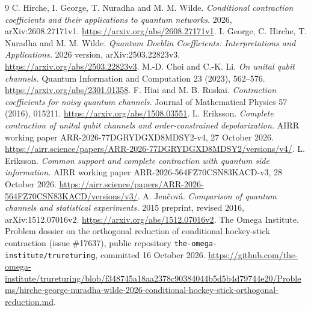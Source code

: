 \documentclass[11pt,a4paper]{article}
\begin{document}
\begin{thebibliography}{9}
 C. Hirche, I. George, T. Nuradha and M. M. Wilde.
\emph{Conditional contraction coefficients and their applications to quantum networks.}
2026, arXiv:2608.27171v1. \url{https://arxiv.org/abs/2608.27171v1}.
 I. George, C. Hirche, T. Nuradha and M. M. Wilde.
\emph{Quantum Doeblin Coefficients: Interpretations and Applications.}
2026 version, arXiv:2503.22823v3. \url{https://arxiv.org/abs/2503.22823v3}.
 M.-D. Choi and C.-K. Li.
\emph{On unital qubit channels.} Quantum Information and Computation 23 (2023), 562--576.
\url{https://arxiv.org/abs/2301.01358}.
 F. Hiai and M. B. Ruskai.
\emph{Contraction coefficients for noisy quantum channels.} Journal of Mathematical Physics 57 (2016), 015211.
\url{https://arxiv.org/abs/1508.03551}.
 L. Eriksson.
\emph{Complete contraction of unital qubit channels and order-constrained depolarization.}
AIRR working paper ARR-2026-77DGRYDGXD8MDSY2-v4, 27 October 2026.
\url{https://airr.science/papers/ARR-2026-77DGRYDGXD8MDSY2/versions/v4/}.
 L. Eriksson.
\emph{Common support and complete contraction with quantum side information.}
AIRR working paper ARR-2026-564FZ70CSN83KACD-v3, 28 October 2026.
\url{https://airr.science/papers/ARR-2026-564FZ70CSN83KACD/versions/v3/}.
 A. Jen\v{c}ov\'a.
\emph{Comparison of quantum channels and statistical experiments.}
2015 preprint, revised 2016, arXiv:1512.07016v2. \url{https://arxiv.org/abs/1512.07016v2}.
 The Omega Institute.
Problem dossier on the orthogonal reduction of conditional hockey-stick contraction (issue \#17637), public repository \nolinkurl{the-omega-institute/trureturing}, committed 16 October 2026.
\url{https://github.com/the-omega-institute/trureturing/blob/f348745a18aa2378c90384044b5d5b4d79744e20/Problems/hirche-george-nuradha-wilde-2026-conditional-hockey-stick-orthogonal-reduction.md}.
\end{thebibliography}
\end{document}
